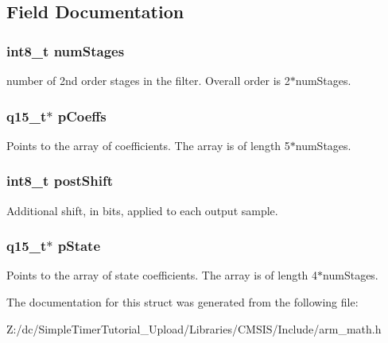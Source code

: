\subsection{Field Documentation}
\hypertarget{structarm__biquad__casd__df1__inst__q15_af59c4ceb94f92d6613492b37e7c949de}{
\subsubsection[{num\-Stages}]{\setlength{\rightskip}{0pt plus 5cm}int8\-\_\-t num\-Stages}}\label{structarm__biquad__casd__df1__inst__q15_af59c4ceb94f92d6613492b37e7c949de}
number of 2nd order stages in the filter. Overall order is 2$\ast$num\-Stages. \hypertarget{structarm__biquad__casd__df1__inst__q15_a7ca181a37f714d174445f486bebce26f}{
\subsubsection[{p\-Coeffs}]{\setlength{\rightskip}{0pt plus 5cm}q15\-\_\-t$\ast$ p\-Coeffs}}\label{structarm__biquad__casd__df1__inst__q15_a7ca181a37f714d174445f486bebce26f}
Points to the array of coefficients. The array is of length 5$\ast$num\-Stages. \hypertarget{structarm__biquad__casd__df1__inst__q15_a3603cbf084938b6931bcb05dfe487f09}{
\subsubsection[{post\-Shift}]{\setlength{\rightskip}{0pt plus 5cm}int8\-\_\-t post\-Shift}}\label{structarm__biquad__casd__df1__inst__q15_a3603cbf084938b6931bcb05dfe487f09}
Additional shift, in bits, applied to each output sample. \hypertarget{structarm__biquad__casd__df1__inst__q15_ae29dfdb736374fcddaeaec4b7770170c}{
\subsubsection[{p\-State}]{\setlength{\rightskip}{0pt plus 5cm}q15\-\_\-t$\ast$ p\-State}}\label{structarm__biquad__casd__df1__inst__q15_ae29dfdb736374fcddaeaec4b7770170c}
Points to the array of state coefficients. The array is of length 4$\ast$num\-Stages. 

The documentation for this struct was generated from the following file\-:\begin{DoxyCompactItemize}
\item 
Z\-:/dc/\-Simple\-Timer\-Tutorial\-\_\-\-Upload/\-Libraries/\-C\-M\-S\-I\-S/\-Include/arm\-\_\-math.\-h\end{DoxyCompactItemize}
